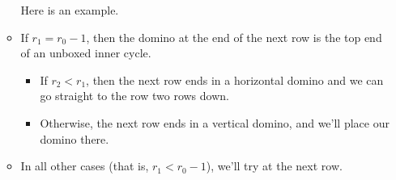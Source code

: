 \documentclass[12pt]{article}
\numberwithin{equation}{section}
\newcommand{\horizontalDominoMaybe}[3]{\filldraw [dominoMaybeStyle] (#2 - 1 + \eps, #1 - 1 + \eps) rectangle + (2 - \teps, 1 -\teps) node [dominoText] {$#3$};}
\newcommand{\greenCircle}[2]{\filldraw[green] (#2 - .5, #1 - .5) circle (.2cm);}
\begin{document}
\begin{itemize}
\begin{itemize}
      Here is an example.
      \begin{figure}[H]
        \centering
      \end{figure}

      \item If $r_1 = r_0 - 1$, then the domino at the end of the next row is the top end of an unboxed inner cycle.
      \begin{itemize}
        \item If $r_2 < r_1$, then the next row ends in a horizontal domino and we can go straight to the row two rows down.
        \begin{figure}[H]
          \centering
        \end{figure}
        \item Otherwise, the next row ends in a vertical domino, and we'll place our domino there.
        \begin{figure}[H]
          \centering
        \end{figure}
      \end{itemize}
      \item In all other cases (that is, $r_1 < r_0 - 1$), we'll try at the next row.

\end{itemize}
\end{itemize}
\end{document}
